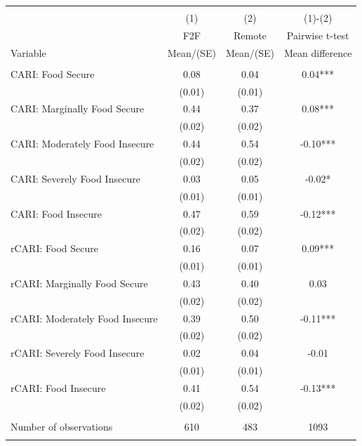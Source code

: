 
\begin{tabular}{@{\extracolsep{5pt}}lccc}
\\[-1.8ex]\hline \hline \\[-1.8ex]
 & \multicolumn{1}{c}{(1)}  & \multicolumn{1}{c}{(2)}  & \multicolumn{1}{c}{(1)-(2)} \\
 & \multicolumn{1}{c}{F2F}  & \multicolumn{1}{c}{Remote}  & \multicolumn{1}{c}{Pairwise t-test}  \\
Variable & Mean/(SE) & Mean/(SE) & Mean difference \\ \hline \\[-1.8ex] 
CARI: Food Secure   & 0.08    & 0.04    & 0.04***   \\
 & (0.01)  & (0.01)  &  \\ [1ex]
CARI: Marginally Food Secure   & 0.44    & 0.37    & 0.08***   \\
 & (0.02)  & (0.02)  &  \\ [1ex]
CARI: Moderately Food Insecure   & 0.44    & 0.54    & -0.10***   \\
 & (0.02)  & (0.02)  &  \\ [1ex]
CARI: Severely Food Insecure   & 0.03    & 0.05    & -0.02*   \\
 & (0.01)  & (0.01)  &  \\ [1ex]
CARI: Food Insecure   & 0.47    & 0.59    & -0.12***   \\
 & (0.02)  & (0.02)  &  \\ [1ex]
rCARI: Food Secure   & 0.16    & 0.07    & 0.09***   \\
 & (0.01)  & (0.01)  &  \\ [1ex]
rCARI: Marginally Food Secure   & 0.43    & 0.40    & 0.03   \\
 & (0.02)  & (0.02)  &  \\ [1ex]
rCARI: Moderately Food Insecure   & 0.39    & 0.50    & -0.11***   \\
 & (0.02)  & (0.02)  &  \\ [1ex]
rCARI: Severely Food Insecure   & 0.02    & 0.04    & -0.01   \\
 & (0.01)  & (0.01)  &  \\ [1ex]
rCARI: Food Insecure   & 0.41    & 0.54    & -0.13***   \\
 & (0.02)  & (0.02)  &  \\ [1ex]
\hline \\[-1.8ex]
Number of observations  & 610   & 483  & 1093  \\
\hline \hline \\[-1.8ex]

\end{tabular}
